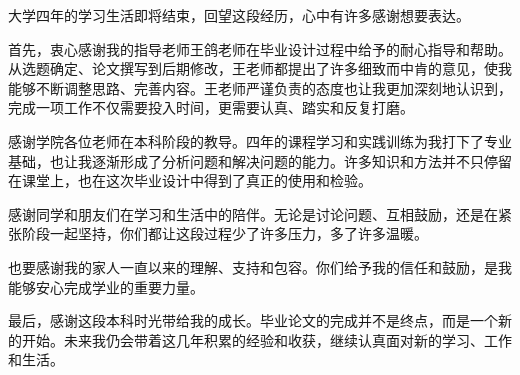 
大学四年的学习生活即将结束，回望这段经历，心中有许多感谢想要表达。

首先，衷心感谢我的指导老师王鸽老师在毕业设计过程中给予的耐心指导和帮助。从选题确定、论文撰写到后期修改，王老师都提出了许多细致而中肯的意见，使我能够不断调整思路、完善内容。王老师严谨负责的态度也让我更加深刻地认识到，完成一项工作不仅需要投入时间，更需要认真、踏实和反复打磨。

感谢学院各位老师在本科阶段的教导。四年的课程学习和实践训练为我打下了专业基础，也让我逐渐形成了分析问题和解决问题的能力。许多知识和方法并不只停留在课堂上，也在这次毕业设计中得到了真正的使用和检验。

感谢同学和朋友们在学习和生活中的陪伴。无论是讨论问题、互相鼓励，还是在紧张阶段一起坚持，你们都让这段过程少了许多压力，多了许多温暖。

也要感谢我的家人一直以来的理解、支持和包容。你们给予我的信任和鼓励，是我能够安心完成学业的重要力量。

最后，感谢这段本科时光带给我的成长。毕业论文的完成并不是终点，而是一个新的开始。未来我仍会带着这几年积累的经验和收获，继续认真面对新的学习、工作和生活。
